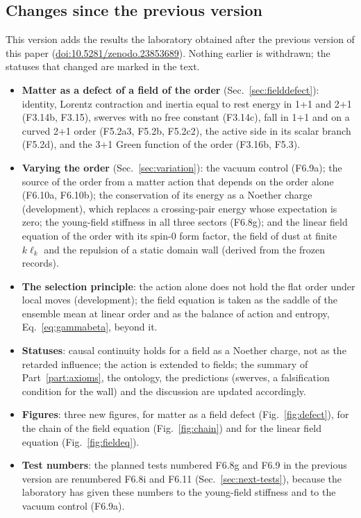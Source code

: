 \subsection{Changes since the previous version}

This version adds the results the laboratory obtained after the previous version of this paper (\href{https://doi.org/10.5281/zenodo.23853689}{doi:10.5281/zenodo.23853689}). Nothing earlier
is withdrawn; the statuses that changed are marked in the text.
\begin{itemize}
\item \textbf{Matter as a defect of a field of the order} (Sec.~\ref{sec:fielddefect}): identity, Lorentz
  contraction and inertia equal to rest energy in 1+1 and 2+1 (F3.14b, F3.15), swerves with no free constant
  (F3.14c), fall in 1+1 and on a curved 2+1 order (F5.2a3, F5.2b, F5.2c2), the active side in its scalar branch
  (F5.2d), and the 3+1 Green function of the order (F3.16b, F5.3).
\item \textbf{Varying the order} (Sec.~\ref{sec:variation}): the vacuum control (F6.9a); the source of the order from a
  matter action that depends on the order alone (F6.10a, F6.10b); the conservation of its energy as a Noether charge
  (development), which replaces a crossing-pair energy whose expectation is zero; the young-field stiffness in all
  three sectors (F6.8g); and the linear field equation of the order with its spin-0 form factor, the field of dust
  at finite $k\ell_k$ and the repulsion of a static domain wall (derived from the frozen records).
\item \textbf{The selection principle}: the action alone does not hold the flat order under local moves
  (development); the field equation is taken as the saddle of the ensemble mean at linear order and as the balance of
  action and entropy, Eq.~\eqref{eq:gammabeta}, beyond it.
\item \textbf{Statuses}: causal continuity holds for a field as a Noether charge, not as the retarded influence; the
  action is extended to fields; the summary of Part~\ref{part:axioms}, the ontology, the predictions (swerves, a
  falsification condition for the wall) and the discussion are updated accordingly.
\item \textbf{Figures}: three new figures, for matter as a field defect (Fig.~\ref{fig:defect}), for the chain of
  the field equation (Fig.~\ref{fig:chain}) and for the linear field equation (Fig.~\ref{fig:fieldeq}).
\item \textbf{Test numbers}: the planned tests numbered F6.8g and F6.9 in the previous version are renumbered F6.8i
  and F6.11 (Sec.~\ref{sec:next-tests}), because the laboratory has given these numbers to the young-field stiffness and to
  the vacuum control (F6.9a).
\end{itemize}
